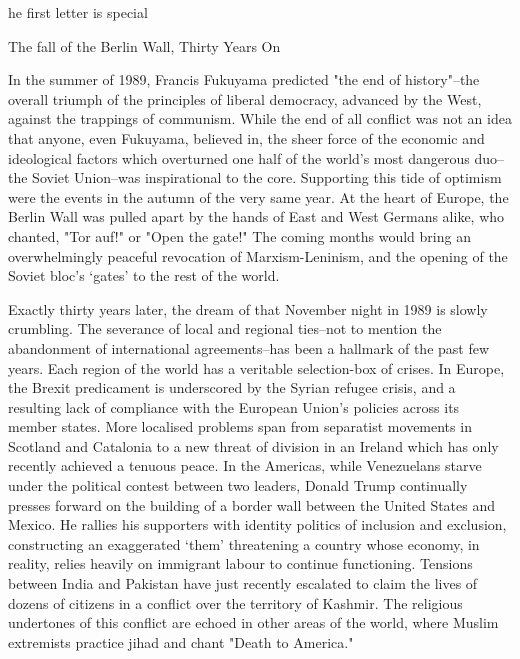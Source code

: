 \label{ch:open-the-gate}

he first letter is special



The fall of the Berlin Wall, Thirty Years On

   In the summer of 1989, Francis Fukuyama predicted "the end of
   history"--the overall triumph of the principles of liberal democracy,
   advanced by the West, against the trappings of communism. While the end
   of all conflict was not an idea that anyone, even Fukuyama, believed
   in, the sheer force of the economic and ideological factors which
   overturned one half of the world's most dangerous duo--the Soviet
   Union--was inspirational to the core. Supporting this tide of optimism
   were the events in the autumn of the very same year. At the heart of
   Europe, the Berlin Wall was pulled apart by the hands of East and West
   Germans alike, who chanted, "Tor auf!" or "Open the gate!" The coming
   months would bring an overwhelmingly peaceful revocation of
   Marxism-Leninism, and the opening of the Soviet bloc's `gates' to the
   rest of the world.

   Exactly thirty years later, the dream of that November night in 1989 is
   slowly crumbling. The severance of local and regional ties--not to
   mention the abandonment of international agreements--has been a
   hallmark of the past few years. Each region of the world has a
   veritable selection-box of crises. In Europe, the Brexit predicament is
   underscored by the Syrian refugee crisis, and a resulting lack of
   compliance with the European Union's policies across its member states.
   More localised problems span from separatist movements in Scotland and
   Catalonia to a new threat of division in an Ireland which has only
   recently achieved a tenuous peace. In the Americas, while Venezuelans
   starve under the political contest between two leaders, Donald Trump
   continually presses forward on the building of a border wall between
   the United States and Mexico. He rallies his supporters with identity
   politics of inclusion and exclusion, constructing an exaggerated `them'
   threatening a country whose economy, in reality, relies heavily on
   immigrant labour to continue functioning. Tensions between India and
   Pakistan have just recently escalated to claim the lives of dozens of
   citizens in a conflict over the territory of Kashmir. The religious
   undertones of this conflict are echoed in other areas of the world,
   where Muslim extremists practice jihad and chant "Death to America."

